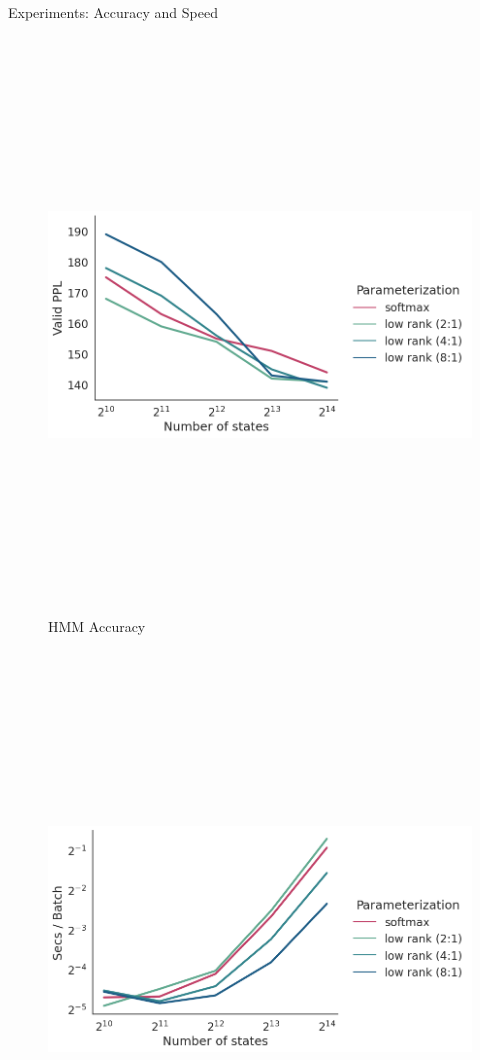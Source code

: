 \documentclass{beamer}
\newlength{\onecolwid}
\begin{document}
\begin{frame}
\begin{columns}[t]
\begin{column}{\onecolwid}
\begin{block}{Experiments: Accuracy and Speed}
\begin{figure}
\includegraphics[height=6in]{imgs/hmm/lhmm-states-features-dropout.png}
\caption{HMM Accuracy}
\end{figure}
\begin{figure}
\includegraphics[height=6in]{imgs/hmm/lhmm-states-features-speed-log.png}

\end{figure}
\end{block}
\end{column}
\end{columns}
\end{frame}
\end{document}
